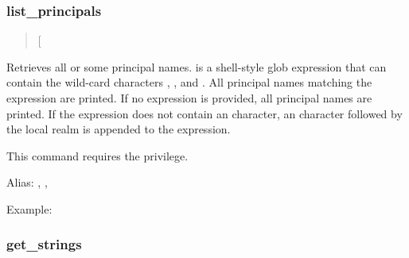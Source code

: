 \documentclass[letterpaper,10pt,english]{sphinxmanual}
\begin{document}
\subsubsection{list\_principals}
\label{\detokenize{admin/admin_commands/kadmin_local:id8}}\label{\detokenize{admin/admin_commands/kadmin_local:list-principals}}\begin{quote}

 {[}\sphinxstyleemphasis{expression}{]}
\end{quote}

Retrieves all or some principal names.   is a shell-style
glob expression that can contain the wild-card characters ,
\sphinxcode{*}, and \sphinxcode{{[}{]}}.  All principal names matching the expression are
printed.  If no expression is provided, all principal names are
printed.  If the expression does not contain an  character, an
 character followed by the local realm is appended to the
expression.

This command requires the  privilege.

Alias: , , 

Example:

%
\begin{sphinxVerbatim}[commandchars=\\\{\}]
   
\end{sphinxVerbatim}


\subsubsection{get\_strings}
\label{\detokenize{admin/admin_commands/kadmin_local:get-strings}}\label{\detokenize{admin/admin_commands/kadmin_local:id9}}\begin{quote}

 
\end{quote}
\end{document}
